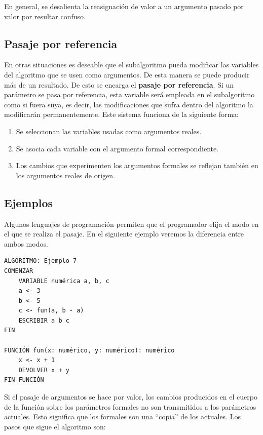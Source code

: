 \documentclass[]{book}
\providecommand{\tightlist}{%
  \setlength{\itemsep}{0pt}\setlength{\parskip}{0pt}}
\begin{document}
En general, se desalienta la reasignación de valor a un argumento pasado
por valor por resultar confuso.

\subsection{Pasaje por referencia}\label{pasaje-por-referencia}

En otras situaciones es deseable que el subalgoritmo pueda modificar las
variables del algoritmo que se usen como argumentos. De esta manera se
puede producir más de un resultado. De esto se encarga el \textbf{pasaje
por referencia}. Si un parámetro se pasa por referencia, esta variable
será empleada en el subalgoritmo como si fuera suya, es decir, las
modificaciones que sufra dentro del algoritmo la modificarán
permanentemente. Este sistema funciona de la siguiente forma:

\begin{enumerate}
\def\labelenumi{\arabic{enumi}.}
\tightlist
\item
  Se seleccionan las variables usadas como argumentos reales.
\item
  Se asocia cada variable con el argumento formal correspondiente.
\item
  Los cambios que experimenten los argumentos formales se reflejan
  también en los argumentos reales de origen.
\end{enumerate}

\subsection{Ejemplos}\label{ejemplos}

Algunos lenguajes de programación permiten que el programador elija el
modo en el que se realiza el pasaje. En el siguiente ejemplo veremos la
diferencia entre ambos modos.

\begin{verbatim}
ALGORITMO: Ejemplo 7
COMENZAR
    VARIABLE numérica a, b, c
    a <- 3
    b <- 5
    c <- fun(a, b - a)
    ESCRIBIR a b c
FIN

FUNCIÓN fun(x: numérico, y: numérico): numérico
    x <- x + 1
    DEVOLVER x + y
FIN FUNCIÓN
\end{verbatim}

Si el pasaje de argumentos se hace por valor, los cambios producidos en
el cuerpo de la función sobre los parámetros formales no son
transmitidos a los parámetros actuales. Esto significa que los formales
son una ``copia'' de los actuales. Los pasos que sigue el algoritmo son:
\end{document}
